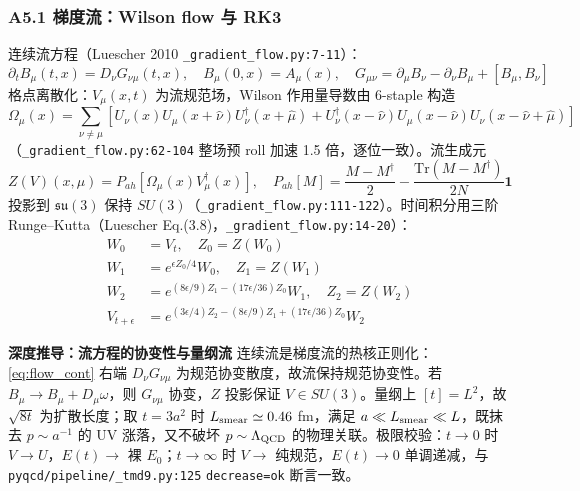 \documentclass[UTF8]{ctexart}
\begin{document}
\subsubsection{A5.1 梯度流：Wilson flow 与 RK3}
连续流方程（Luescher 2010 \texttt{\nolinkurl{\_gradient\_flow.py:7-11}}）：
\begin{equation}
\partial_t B_\mu(t,x) = D_\nu G_{\nu\mu}(t,x),\quad B_\mu(0,x)=A_\mu(x),\quad G_{\mu\nu}= \partial_\mu B_\nu-\partial_\nu B_\mu+[B_\mu,B_\nu]
\label{eq:flow_cont}
\end{equation}
格点离散化：$V_\mu(x,t)$ 为流规范场，Wilson 作用量导数由 6-staple 构造
\begin{equation}
\Omega_\mu(x)=\sum_{\nu\ne\mu}\left[U_\nu(x)U_\mu(x+\hat\nu)U^\dagger_\nu(x+\hat\mu)+U^\dagger_\nu(x-\hat\nu)U_\mu(x-\hat\nu)U_\nu(x-\hat\nu+\hat\mu)\right]
\label{eq:staple}
\end{equation}
（\texttt{\nolinkurl{\_gradient\_flow.py:62-104}} 整场预 roll 加速 1.5 倍，逐位一致）。流生成元
\begin{equation}
Z(V)(x,\mu)=P_{ah}\left[\Omega_\mu(x)V^\dagger_\mu(x)\right],\quad P_{ah}[M]=\frac{M-M^\dagger}{2}-\frac{\mathrm{Tr}(M-M^\dagger)}{2N}\mathbf{1}
\label{eq:Zdef}
\end{equation}
投影到 $\mathfrak{su}(3)$ 保持 $SU(3)$（\texttt{\nolinkurl{\_gradient\_flow.py:111-122}}）。时间积分用三阶 Runge--Kutta（Luescher Eq.(3.8)，\texttt{\nolinkurl{\_gradient\_flow.py:14-20}}）：
\begin{align}
W_0 &= V_t,\quad Z_0=Z(W_0) \nonumber\\
W_1 &= e^{\epsilon Z_0/4}W_0,\quad Z_1=Z(W_1) \nonumber\\
W_2 &= e^{(8\epsilon/9)Z_1-(17\epsilon/36)Z_0}W_1,\quad Z_2=Z(W_2) \label{eq:RK3}\\
V_{t+\epsilon} &= e^{(3\epsilon/4)Z_2-(8\epsilon/9)Z_1+(17\epsilon/36)Z_0}W_2 \nonumber
\end{align}

\begin{keybox}
\textbf{深度推导：流方程的协变性与量纲流}
连续流是梯度流的热核正则化：\eqref{eq:flow_cont} 右端 $D_\nu G_{\nu\mu}$ 为规范协变散度，故流保持规范协变性。若 $B_\mu\to B_\mu+ D_\mu\omega$，则 $G_{\nu\mu}$ 协变，$Z$ 投影保证 $V\in SU(3)$。量纲上 $[t]=L^2$，故 $\sqrt{8t}$ 为扩散长度；取 $t=3a^2$ 时 $L_{\rm smear}\simeq0.46$ fm，满足 $a\ll L_{\rm smear}\ll L$，既抹去 $p\sim a^{-1}$ 的 UV 涨落，又不破坏 $p\sim\Lambda_{\rm QCD}$ 的物理关联。极限校验：$t\to0$ 时 $V\to U$，$E(t)\to$ 裸 $E_0$；$t\to\infty$ 时 $V\to$ 纯规范，$E(t)\to0$ 单调递减，与 \texttt{\nolinkurl{pyqcd/pipeline/\_tmd9.py:125}} \texttt{decrease=ok} 断言一致。
\end{keybox}
\end{document}
